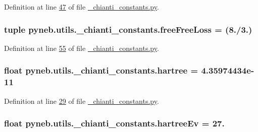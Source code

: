 Definition at line \hyperlink{__chianti__constants_8py_source_l00047}{47} of file \hyperlink{__chianti__constants_8py_source}{\-\_\-chianti\-\_\-constants.\-py}.

\hypertarget{namespacepyneb_1_1utils_1_1__chianti__constants_a46456dd338306ad50b0995e659d51645}{
\subsubsection[{free\-Free\-Loss}]{\setlength{\rightskip}{0pt plus 5cm}tuple pyneb.\-utils.\-\_\-chianti\-\_\-constants.\-free\-Free\-Loss = (8./3.)}}\label{namespacepyneb_1_1utils_1_1__chianti__constants_a46456dd338306ad50b0995e659d51645}


Definition at line \hyperlink{__chianti__constants_8py_source_l00055}{55} of file \hyperlink{__chianti__constants_8py_source}{\-\_\-chianti\-\_\-constants.\-py}.

\hypertarget{namespacepyneb_1_1utils_1_1__chianti__constants_a69a9c70ea753a4a67244d99f3c0d0033}{
\subsubsection[{hartree}]{\setlength{\rightskip}{0pt plus 5cm}float pyneb.\-utils.\-\_\-chianti\-\_\-constants.\-hartree = 4.\-35974434e-\/11}}\label{namespacepyneb_1_1utils_1_1__chianti__constants_a69a9c70ea753a4a67244d99f3c0d0033}


Definition at line \hyperlink{__chianti__constants_8py_source_l00029}{29} of file \hyperlink{__chianti__constants_8py_source}{\-\_\-chianti\-\_\-constants.\-py}.

\hypertarget{namespacepyneb_1_1utils_1_1__chianti__constants_acc530f611b19dcb9fee0a54cf51608be}{
\subsubsection[{hartree\-Ev}]{\setlength{\rightskip}{0pt plus 5cm}float pyneb.\-utils.\-\_\-chianti\-\_\-constants.\-hartree\-Ev = 27.}}\label{namespacepyneb_1_1utils_1_1__chianti__constants_acc530f611b19dcb9fee0a54cf51608be}


